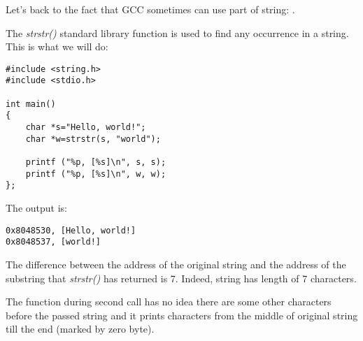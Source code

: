 \label{strstr_example}

Let's back to the fact that GCC sometimes can use part of string: .

The \emph{strstr()} \CCpp standard library function is used to find any occurrence in a string.
This is what we will do:

\begin{lstlisting}[style=customc]
#include <string.h>
#include <stdio.h>

int main()
{
	char *s="Hello, world!";
	char *w=strstr(s, "world");

	printf ("%p, [%s]\n", s, s);
	printf ("%p, [%s]\n", w, w);
};
\end{lstlisting}

The output is:

\begin{lstlisting}
0x8048530, [Hello, world!]
0x8048537, [world!]
\end{lstlisting}

The difference between the address of the original string and the address of the substring that \emph{strstr()} has returned is 7.
Indeed,  string has length of 7 characters.

The \printf{} function during second call has no idea there are some other characters before
the passed string and it prints characters
from the middle of original string till the end (marked by zero byte).

